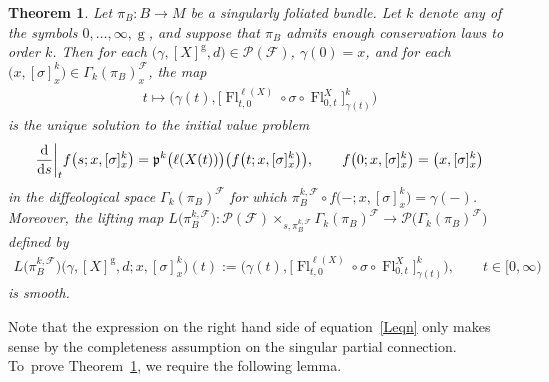 \documentclass[10pt,a4paper]{amsart}
\numberwithin{equation}{section}
\newtheorem{Theorem}{Theorem}[section]
\def\g{\operatorname{g}}
\def\Fl{\operatorname{Fl}}
\def\FF{{\mathcal{F}}}
\def\PP{{\mathcal{P}}}
\def\pf{{\mathfrak{p}}}
\begin{document}
\begin{Theorem}\label{liftsmooth}
Let $\pi_{B}\colon B\rightarrow M$ be a singularly foliated bundle. Let $k$ denote any of the symbols $0,\dots,\infty,\g$, and suppose that $\pi_{B}$ admits enough conservation laws to order $k$. Then for each $\big(\gamma,[X]^{\g},d\big)\in\PP(\FF)$, $\gamma(0) = x$, and for each $\big(x,[\sigma]^{k}_{x}\big)\in\Gamma_{k}(\pi_{B})^{\FF}_{x}$, the map
\begin{gather}\label{ivpsol}
t\mapsto\big(\gamma(t),\big[\Fl^{\ell(X)}_{t,0}\circ\sigma\circ\Fl^{X}_{0,t}\big]^{k}_{\gamma(t)}\big)
\end{gather}
is the unique solution to the initial value problem
\begin{gather}\label{ivp}
\frac{\rm d}{{\rm d}s}\bigg|_{t}f\big(s;x,[\sigma]^{k}_{x}\big) = \pf^{k}\big(\ell(X(t))\big)\big(f\big(t;x,[\sigma]^{k}_{x}\big)\big),\qquad
f\big(0;x,[\sigma]^{k}_{x}\big) = \big(x,[\sigma]^{k}_{x}\big)
\end{gather}
in the diffeological space $\Gamma_{k}(\pi_{B})^{\FF}$ for which $\pi_{B}^{k,\FF}\circ f\big({-};x,[\sigma]^{k}_{x}\big) = \gamma(-)$. Moreover, the lifting map $L\big(\pi_{B}^{k,\FF}\big)\colon \PP(\FF)\times_{s,\pi_{B}^{k,\FF}}\Gamma_{k}(\pi_{B})^{\FF}\rightarrow \PP\big(\Gamma_{k}(\pi_{B})^{\FF}\big)$ defined by
\begin{gather}\label{Leqn}
L\big(\pi_{B}^{k,\FF}\big)\big(\gamma,[X]^{\g},d;x,[\sigma]^{k}_{x}\big)(t):=
\big(\gamma(t),\big[\Fl^{\ell(X)}_{t,0}\circ\sigma\circ\Fl^{X}_{0,t}\big]^{k}_{\gamma(t)}\big),\qquad t\in[0,\infty)
\end{gather}
is smooth.
\end{Theorem}


Note that the expression on the right hand side of equation~\eqref{Leqn} only makes sense by the completeness assumption on the singular partial connection. To~prove Theorem~\ref{liftsmooth}, we require the following lemma.
\end{document}
